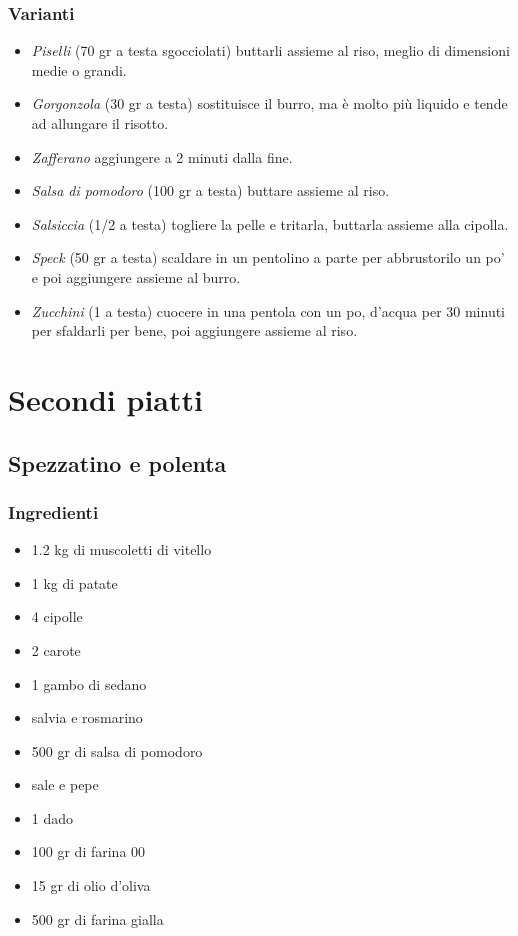 \documentclass[12pt, a4paper]{article}
\begin{document}
\clearpage
\subsubsection{Varianti}
\begin{itemize}
\item \emph{Piselli} (70 gr a testa sgocciolati) buttarli assieme al riso,
	meglio di dimensioni medie o grandi.
\item \emph{Gorgonzola} (30 gr a testa) sostituisce il burro, ma è molto
	più liquido e tende ad allungare il risotto.
\item \emph{Zafferano} aggiungere a 2 minuti dalla fine.
\item \emph{Salsa di pomodoro} (100 gr a testa) buttare assieme al riso.
\item \emph{Salsiccia} (1/2 a testa) togliere la pelle e tritarla, buttarla 
	assieme	alla cipolla.
\item \emph{Speck} (50 gr a testa) scaldare in un pentolino a parte per
	abbrustorilo un po' e poi aggiungere assieme al burro.
\item \emph{Zucchini} (1 a testa) cuocere in una pentola con un po, d'acqua
	per 30 minuti per sfaldarli per bene, poi aggiungere 
	assieme	al riso.
\end{itemize}
\clearpage

\section{Secondi piatti}

\subsection{Spezzatino e polenta}

\subsubsection{Ingredienti}
\begin{itemize}
\item   1.2 kg di muscoletti di vitello
\item 	1 kg di patate
\item 	4 cipolle
\item 	2 carote
\item 	1 gambo di sedano
\item 	salvia e rosmarino
\item 	500 gr di salsa di pomodoro
\item 	sale e pepe
\item 	1 dado
\item 	100 gr di farina 00
\item 	15 gr di olio d'oliva
\item 	500 gr di farina gialla
\end{itemize}
\end{document}
